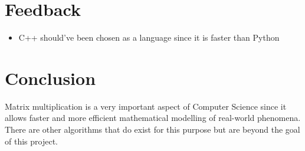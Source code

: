 \documentclass{article}
\begin{document}
\section{Feedback}
\begin{itemize}
    \item C++ should've been chosen as a language since it is faster than Python
\end{itemize}

\section{Conclusion}
Matrix multiplication is a very important aspect of Computer Science since it allows faster and more efficient mathematical modelling of real-world phenomena. There are other algorithms that do exist for this purpose but are beyond the goal of this project.
\end{document}
